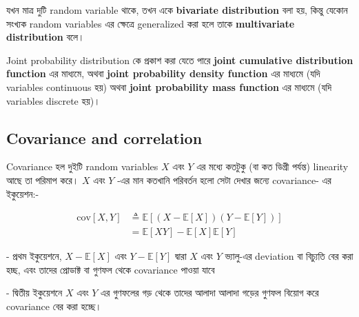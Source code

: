 \documentclass[graybox, envcountchap, twocolumn]{styles/svmult}
\begin{document}
{\bengalifont যখন মাত্র দুটি random variable থাকে, তখন একে \textbf{bivariate distribution} বলা হয়, কিন্তু যেকোন সংখ্যক random variables এর ক্ষেত্রে generalized করা হলে তাকে  \textbf{multivariate distribution} বলে।}

{\bengalifont Joint probability distribution কে প্রকাশ করা যেতে পারে \textbf{joint cumulative distribution function} এর মাধ্যমে, অথবা \textbf{joint probability density function} এর মাধ্যমে (যদি variables continuous হয়) অথবা \textbf{joint probability mass function} এর মাধ্যমে (যদি variables discrete হয়)।}




\subsection{Covariance and correlation}

\begin{definition}

Covariance {\bengalifont হল দুইটি random variables $X$ এবং $Y$ এর মধ্যে কতটুকু (বা কত ডিগ্রী পর্যন্ত) linearity আছে তা পরিমাপ করে। $X$ এবং $Y$ -এর মান কতখানি পরিবর্তন হলো সেটা দেখার জন্যে covariance- এর ইকুয়েশন:- }

\begin{equation}
\begin{split}
\mathrm{cov}[X,Y] & \triangleq \mathbb{E}\left[(X-\mathbb{E}[X])(Y-\mathbb{E}[Y])\right] \\
         & =\mathbb{E}[XY]-\mathbb{E}[X]\mathbb{E}[Y]
\end{split}
\end{equation}

{\bengalifont 
-   প্রথম ইকুয়েশনে, $X-\mathbb{E}[X]$ এবং $Y-\mathbb{E}[Y]$ দ্বারা $X$ এবং $Y$ ভ্যালু-এর deviation বা বিচ্যুতি বের করা হচ্ছ, এবং তাদের প্রোডাক্ট বা গুণফল থেকে covariance পাওয়া যাবে 

-   দ্বিতীয় ইকুয়েশনে $X$ এবং $Y$ এর গুণফলের গড় থেকে তাদের আলাদা আলাদা গড়ের গুণফল বিয়োগ করে covariance বের করা হচ্ছে। }


\end{definition}
\end{document}
